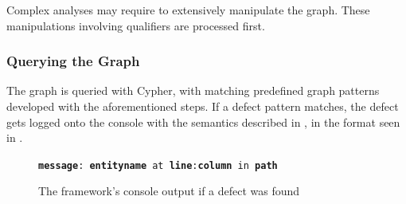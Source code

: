 Complex analyses may require to extensively manipulate the graph. These manipulations involving qualifiers are processed first.


\subsubsection{Querying the Graph}

The graph is queried with Cypher, with matching predefined graph patterns developed with the aforementioned steps. If a defect pattern matches, the defect gets logged onto the console with the semantics described in , in the format seen in .

\vspace{0.5em}
\begin{figure}[!htb]
	\centering
	\texttt{\textbf{message}: \textbf{entityname} at \textbf{line}:\textbf{column} in \textbf{path}}
  \caption{The framework's console output if a defect was found}
  \label{fig:defect-found-logger}
\end{figure}